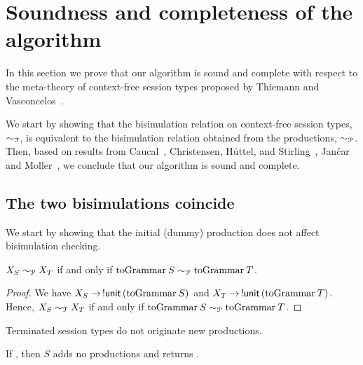 \section{Soundness and completeness of the algorithm}
\label{sec:soundness}

In this section we prove that our algorithm is sound and complete
with respect to the meta-theory of context-free session types proposed
by Thiemann and Vasconcelos~\cite{thiemann2016context}.

We start by showing that the bisimulation relation on context-free
session types, $\sim_\mathcal T$, is equivalent to the bisimulation
relation obtained from the productions, $\sim_\mathcal P$.  Then, based on
results from Caucal~\cite{caucal1986decidabilite}, Christensen,
H{\"{u}}ttel, and Stirling~\cite{DBLP:journals/iandc/ChristensenHS95},
Jan{\v{c}}ar and Moller~\cite{janvcar1999techniques}, we conclude that
our algorithm is sound and complete.

\subsection{The two bisimulations coincide}

We start by showing that the initial (dummy) production does not
affect bisimulation checking.
%
\begin{lemma}
  \label{lem:dummy}
  $X_S \sim_\mathcal P X_T$ if and only if
  $\toGrammarf S \ProdEquiv \toGrammarf T$.
\end{lemma}

\begin{proof}
  We have $X_S \rightarrow\, \initialProd\,(\toGrammarf S)$ and
  $X_T \rightarrow\, \initialProd\,(\toGrammarf T)$.
  Hence, $X_S \sim_\mathcal T X_T$ if and only if
  $\toGrammarf S \ProdEquiv \toGrammarf T$. 
\end{proof}

Terminated session types do not originate new productions.

\begin{lemma}
  \label{lemma:terminated_session}
  If , then $S$ adds no
  productions and returns \upshape{\lstinline|[]|}.
\end{lemma}

